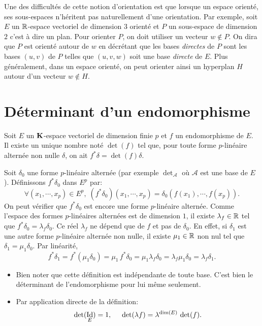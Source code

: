  Une des difficultés de cette notion d'orientation est que lorsque un espace orienté, ses sous-espaces n'héritent pas naturellement d'une orientation.\newline
{} Par exemple, soit $E$ un $\mathbb{R}$-espace vectoriel de dimension $3$ orienté et $P$ un sous-espace de dimension $2$ c'est à dire un plan. Pour orienter $P$, on doit utiliser un vecteur $w\notin P$.\newline
On dira que $P$ est orienté autour de $w$ en décrétant que les bases \emph{directes} de $P$ sont les bases $(u,v)$ de $P$ telles que $(u,v,w)$ soit une base \emph{directe} de $E$. Plus généralement, dans un espace orienté, on peut orienter ainsi un hyperplan $H$ autour d'un vecteur $w\notin H$.
\clearpage

\section{Déterminant d'un endomorphisme}
\begin{propdef}
 Soit $E$ un $\mathbf{K}$-espace vectoriel de dimension finie $p$ et $f$ un endomorphisme de $E$. Il existe un unique nombre noté $\det(f)$ tel que, pour toute forme $p$-linéaire alternée non nulle $\delta$, on ait $f^*\delta = \det(f) \delta$.
\end{propdef}
\begin{demo}
Soit $\delta_0$ une forme $p$-linéaire alternée (par exemple $\det_\mathcal{A}$ où $\mathcal{A}$ est une base de $E$). Définissons $f^*\delta_0$ dans $E^p$ par:
 \[
   \forall (x_1, \cdots, x_p)\in E^p, \; (f^*\delta_0)(x_1, \cdots, x_p) = \delta_0(f(x_1), \cdots, f(x_p)).
 \]
On peut vérifier que $f^*\delta_0$ est encore une forme $p$-linéaire alternée. Comme l'espace des formes $p$-linéaires alternées est de dimension $1$, il existe $\lambda_f \in \mathbb{R}$ tel que $f^*\delta_0 = \lambda_f \delta_0$. Ce réel $\lambda_f$ ne dépend que de $f$ et pas de $\delta_0$. En effet, si $\delta_1$ est une autre forme $p$-linéaire alternée non nulle, il existe $\mu_1 \in \mathbb{R}$ non nul tel que $\delta_1 = \mu_1 \delta_0$. Par linéarité,
\[
  f^*\delta_1 = f^*(\mu_1\delta_0) = \mu_1\, f^* \delta_0 = \mu_1 \lambda_f \delta_0 = \lambda_f \mu_1 \delta_0 = \lambda_f \delta_1. 
\]
\end{demo}
\begin{rems}
\begin{itemize}
  \item Bien noter que cette définition est indépendante de toute base. C'est bien le déterminant de l'endomorphisme pour lui même seulement.
  \item Par application directe de la définition:
\[
  \det(\mathop{\mathrm{Id}}_E) = 1,\hspace{0.5cm} \det(\lambda f) = \lambda^{\dim(E)}\, \det(f).
\]
\end{itemize}
\end{rems}
